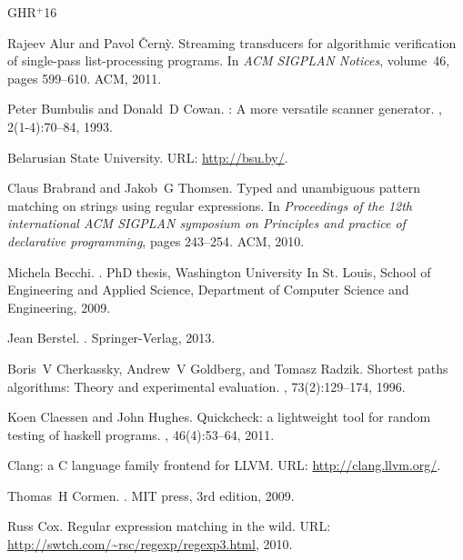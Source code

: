 \documentclass{article}
\theoremstyle{definition}
\begin{document}
\nocite{*}

\newcommand{\etalchar}[1]{$^{#1}$}
\begin{thebibliography}{GHR{\etalchar{+}}16}

Rajeev Alur and Pavol {\v{C}}ern{\`y}.
\newblock Streaming transducers for algorithmic verification of single-pass
  list-processing programs.
\newblock In {\em ACM SIGPLAN Notices}, volume~46, pages 599--610. ACM, 2011.

Peter Bumbulis and Donald~D Cowan.
: A more versatile scanner generator.
,
  2(1-4):70--84, 1993.

{B}elarusian {S}tate {U}niversity.
\newblock URL: \url{http://bsu.by/}.

Claus Brabrand and Jakob~G Thomsen.
\newblock Typed and unambiguous pattern matching on strings using regular
  expressions.
\newblock In {\em Proceedings of the 12th international ACM SIGPLAN symposium
  on Principles and practice of declarative programming}, pages 243--254. ACM,
  2010.

Michela Becchi.
.
\newblock PhD thesis, Washington University In St. Louis, School of Engineering
  and Applied Science, Department of Computer Science and Engineering, 2009.

Jean Berstel.
.
\newblock Springer-Verlag, 2013.

Boris~V Cherkassky, Andrew~V Goldberg, and Tomasz Radzik.
\newblock Shortest paths algorithms: Theory and experimental evaluation.
, 73(2):129--174, 1996.

Koen Claessen and John Hughes.
\newblock Quickcheck: a lightweight tool for random testing of haskell
  programs.
, 46(4):53--64, 2011.

{Clang}: a {C} language family frontend for {LLVM}.
\newblock URL: \url{http://clang.llvm.org/}.

Thomas~H Cormen.
.
\newblock MIT press, 3rd edition, 2009.

Russ Cox.
\newblock Regular expression matching in the wild.
\newblock URL: \url{http://swtch.com/~rsc/regexp/regexp3.html}, 2010.


\end{thebibliography}
\end{document}
